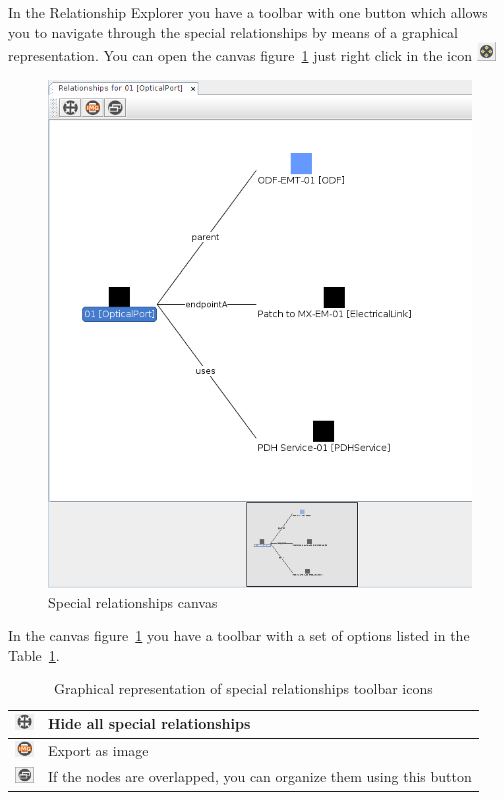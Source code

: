 \documentclass[a4paper]{article}
\begin{document}
		In the Relationship Explorer you have a toolbar with one button which allows you to navigate through the special relationships by means of a graphical representation. You can open the canvas figure~\ref{fig:graphical_representation_relationships} just right click in the icon \includegraphics[width=0.5cm]{img/icon_graphical_representation_relationships.png}		
						
		\begin{figure}[h!]
			\centering
			\includegraphics[width=0.4\linewidth]{img/graphical_representation_relationships.png}
			\caption{Special relationships canvas}
			\label{fig:graphical_representation_relationships}
		\end{figure}
			
		In the canvas figure~\ref{fig:graphical_representation_relationships} you have a toolbar with a set of options listed in the Table~\ref{tab:graphical_representation_relationships_toolbar_icons}.
			
		\begin{table}[h!]
			\centering
			\begin{tabular}{cl}
				\includegraphics[width=0.5cm]{img/icon_collapse_all.png} & Hide all special relationships\\
				\midrule
				\includegraphics[width=0.5cm]{img/icon_export_as_image.png} & Export as image\\
				\midrule
				\includegraphics[width=0.5cm]{img/icon_reorganize_nodes.png} & If the nodes are overlapped, you can organize them using this button\\
				\midrule
			\end{tabular}
			\caption{Graphical representation of special relationships toolbar icons}
			\label{tab:graphical_representation_relationships_toolbar_icons}
		\end{table}
			
\end{document}
